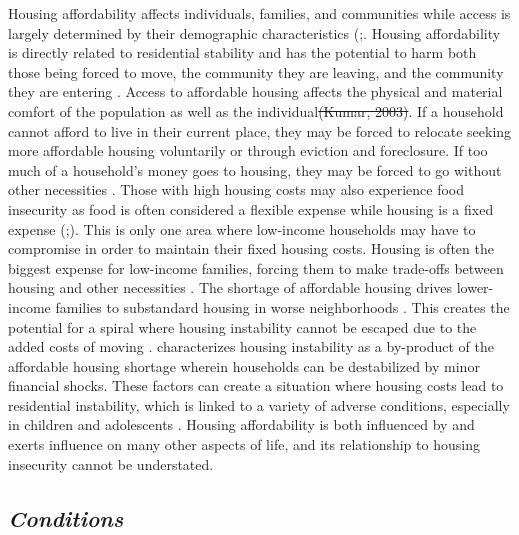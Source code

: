 Housing affordability affects individuals, families, and communities while access is largely determined by their demographic characteristics  (\citealp{braveman_housing_2011};\citealp{yadavalli_comprehensive_2020}. Housing affordability is directly related to residential stability and has the potential to harm both those being forced to move, the community they are leaving, and the community they are entering \citep{desmond_forced_2015}. Access to affordable housing affects the physical and material comfort of the population as well as the individual\sout{(Kumar, 2003)}. If a household cannot afford to live in their current place, they may be forced to relocate seeking more affordable housing voluntarily or through eviction and foreclosure.  If too much of a household’s money goes to housing, they may be forced to go without other necessities \citep{herbert_measuring_2018}. Those with high housing costs may also experience food insecurity as food is often considered a flexible expense while housing is a fixed expense (\citealp{fletcher_assessing_2009};\citealp{kropczynski_insights_2012}). This is only one area where low-income households may have to compromise in order to maintain their fixed housing costs. Housing is often the biggest expense for low-income families, forcing them to make trade-offs between housing and other necessities \citep{desmond_housing_2015}. The shortage of affordable housing drives lower-income families to substandard housing in worse neighborhoods \citep{braveman_housing_2011}. This creates the potential for a spiral where housing instability cannot be escaped due to the added costs of moving .\citet{kang_severe_2021} characterizes housing instability as a by-product of the affordable housing shortage wherein households can be destabilized by minor financial shocks. These factors can create a situation where housing costs lead to residential instability, which is linked to a variety of adverse conditions, especially in children and adolescents \citep{desmond_forced_2015}. Housing affordability is both influenced by and exerts influence on many other aspects of life, and its relationship to housing insecurity cannot be understated. 

\subsection{\textit{Conditions}}

